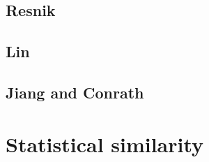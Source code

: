 \subsection{Resnik} %
\label{sub:resnik}


\subsection{Lin} %
\label{sub:lin}


\subsection{Jiang and Conrath} %
\label{sub:jiang_and_conrath}


\section{Statistical similarity} %
\label{sec:statistical_similarity}

